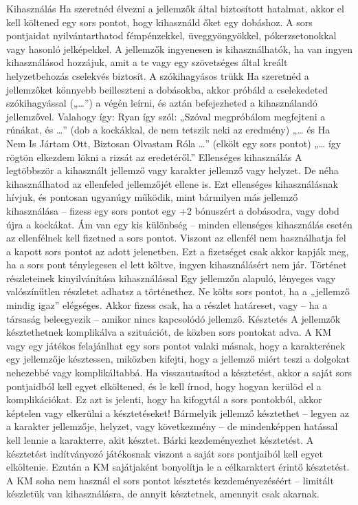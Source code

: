 \documentclass[oneside]{book}
\begin{document}
Kihasználás
Ha szeretnéd élvezni a jellemzők által biztosított hatalmat, akkor el kell költened egy sors pontot, hogy kihasználd őket egy dobáshoz. A sors pontjaidat nyilvántarthatod fémpénzekkel, üveggyöngyökkel, pókerzsetonokkal vagy hasonló jelképekkel.
A jellemzők ingyenesen is kihasználhatók, ha van ingyen kihasználásod hozzájuk, amit a te vagy egy szövetséges által kreált helyzetbehozás cselekvés biztosít.
A szókihagyásos trükk
Ha szeretnéd a jellemzőket könnyebb beilleszteni a dobásokba, akkor próbáld a cselekedeted szókihagyással („…”) a végén leírni, és aztán befejezheted a kihasználandó jellemzővel. Valahogy így:
Ryan így szól: „Szóval megpróbálom megfejteni a rúnákat, és …” (dob a kockákkal, de nem tetszik neki az eredmény) „… és Ha Nem Is Jártam Ott, Biztosan Olvastam Róla …” (elkölt egy sors pontot) „… így rögtön elkezdem lökni a rizsát az eredetéről.”
Ellenséges kihasználás
A legtöbbször a kihasznált jellemző vagy karakter jellemző vagy helyzet. De néha kihasználhatod az ellenfeled jellemzőjét ellene is. Ezt ellenséges kihasználásnak hívjuk, és pontosan ugyanúgy működik, mint bármilyen más jellemző kihasználása – fizess egy sors pontot egy +2 bónuszért a dobásodra, vagy dobd újra a kockákat. Ám van egy kis különbség – minden ellenséges kihasználás esetén az ellenfélnek kell fizetned a sors pontot. Viszont az ellenfél nem használhatja fel a kapott sors pontot az adott jelenetben. Ezt a fizetséget csak akkor kapják meg, ha a sors pont ténylegesen el lett költve, ingyen kihasználásért nem jár.
Történet részleteinek kinyilvánítása kihasználással
Egy jellemzőn alapuló, lényeges vagy valószínűtlen részletet adhatsz a történethez. Ne költs sors pontot, ha a „jellemző mindig igaz” elégséges. Akkor fizess csak, ha a részlet határeset, vagy – ha a társaság beleegyezik – amikor nincs kapcsolódó jellemző.
Késztetés
A jellemzők késztethetnek komplikálva a szituációt, de közben sors pontokat adva. A KM vagy egy játékos felajánlhat egy sors pontot valaki másnak, hogy a karakterének egy jellemzője késztessen, miközben kifejti, hogy a jellemző miért teszi a dolgokat nehezebbé vagy komplikáltabbá. Ha visszautasítod a késztetést, akkor a saját sors pontjaidból kell egyet elköltened, és le kell írnod, hogy hogyan kerülöd el a komplikációkat. Ez azt is jelenti, hogy ha kifogytál a sors pontokból, akkor képtelen vagy elkerülni a késztetéseket!
Bármelyik jellemző késztethet – legyen az a karakter jellemzője, helyzet, vagy következmény – de mindenképpen hatással kell lennie a karakterre, akit késztet.
Bárki kezdeményezhet késztetést. A késztetést indítványozó játékosnak viszont a saját sors pontjaiból kell egyet elköltenie. Ezután a KM sajátjaként bonyolítja le a célkaraktert érintő késztetést. A KM soha nem használ el sors pontot késztetés kezdeményezéséért – limitált készletük van kihasználásra, de annyit késztetnek, amennyit csak akarnak.
\end{document}
